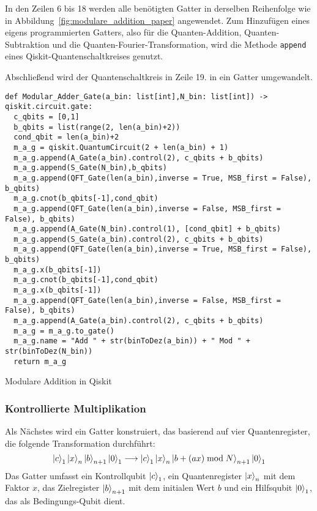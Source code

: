 In den Zeilen 6 bis 18 werden alle benötigten Gatter 
in derselben Reihenfolge wie in Abbildung~\ref{fig:modulare_addition_paper} angewendet.
Zum Hinzufügen eines eigens programmierten Gatters, 
also für die Quanten-Addition, Quanten-Subtraktion und die Quanten-Fourier-Transformation,
wird die Methode \texttt{append} eines Qiskit-Quantenschaltkreises genutzt.

Abschließend wird der Quantenschaltkreis in Zeile 19. in ein Gatter umgewandelt.

\begin{listing}[H]
\begin{verbatim}    
def Modular_Adder_Gate(a_bin: list[int],N_bin: list[int]) -> qiskit.circuit.gate:
  c_qbits = [0,1]
  b_qbits = list(range(2, len(a_bin)+2))
  cond_qbit = len(a_bin)+2
  m_a_g = qiskit.QuantumCircuit(2 + len(a_bin) + 1) 
  m_a_g.append(A_Gate(a_bin).control(2), c_qbits + b_qbits)
  m_a_g.append(S_Gate(N_bin),b_qbits)
  m_a_g.append(QFT_Gate(len(a_bin),inverse = True, MSB_first = False), b_qbits)
  m_a_g.cnot(b_qbits[-1],cond_qbit)
  m_a_g.append(QFT_Gate(len(a_bin),inverse = False, MSB_first = False), b_qbits)
  m_a_g.append(A_Gate(N_bin).control(1), [cond_qbit] + b_qbits)
  m_a_g.append(S_Gate(a_bin).control(2), c_qbits + b_qbits)
  m_a_g.append(QFT_Gate(len(a_bin),inverse = True, MSB_first = False), b_qbits)
  m_a_g.x(b_qbits[-1])
  m_a_g.cnot(b_qbits[-1],cond_qbit)
  m_a_g.x(b_qbits[-1])
  m_a_g.append(QFT_Gate(len(a_bin),inverse = False, MSB_first = False), b_qbits)
  m_a_g.append(A_Gate(a_bin).control(2), c_qbits + b_qbits)
  m_a_g = m_a_g.to_gate()
  m_a_g.name = "Add " + str(binToDez(a_bin)) + " Mod " + str(binToDez(N_bin))
  return m_a_g
  \end{verbatim}
  \caption{Modulare Addition in Qiskit}
  \label{code:ModularAddition}
\end{listing}

\subsubsection{Kontrollierte Multiplikation}
Als Nächstes wird ein Gatter konstruiert, 
das basierend auf vier Quantenregister,
die folgende Transformation durchführt: 
\[\ket{c}_1\ket{x}_{n}\ket{b}_{n+1}\ket{0}_1
\longrightarrow
\ket{c}_1\ket{x}_{n}\ket{b + (ax)\bmod N}_{n+1}\ket{0}_1\]
Das Gatter umfasst ein Kontrollqubit \(\ket{c}_1\), 
ein Quantenregister \(\ket{x}_{n}\) mit dem Faktor \(x\),
das Zielregister \(\ket{b}_{n+1}\) mit dem initialen Wert \(b\) und 
ein Hilfsqubit \(\ket{0}_1\), das als Bedingungs-Qubit dient.

